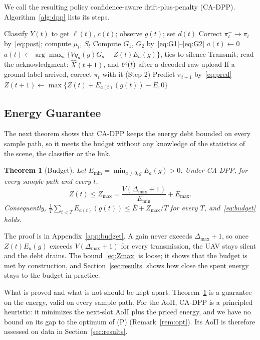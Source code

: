\documentclass[journal]{IEEEtran}
\newtheorem{theorem}{Theorem}
\theoremstyle{remark}
\newcommand{\lab}{\ell}
\begin{document}
We call the resulting policy confidence-aware drift-plus-penalty (CA-DPP). Algorithm~\ref{alg:dpp} lists its steps.

\begin{algorithm}[t]
\caption{CA-DPP, executed by the UAV in slot $t$}\label{alg:dpp}
\begin{algorithmic}[1]
\State Classify $Y(t)$ to get $\lab(t)$, $c(t)$; observe $g(t)$; set $d(t)$
\State Correct $\pi^-_t\to\pi_t$ by~\eqref{eq:post}; compute $\mu_t$, $S_t$
\State Compute $G_1$, $G_2$ by~\eqref{eq:G1}--\eqref{eq:G2}
 $a(t)\gets0$
\Else\ $a(t)\gets\arg\max_a\{Vq_a(g)G_a-Z(t)E_a(g)\}$, ties to silence
\EndIf
\State Transmit; read the acknowledgment: $\hat X(t+1)$, and $\lab^{\rm g}(t)$ after a decoded raw upload
\State If a ground label arrived, correct $\pi_t$ with it (Step 2)
\State Predict $\pi^-_{t+1}$ by~\eqref{eq:pred}
\State $Z(t+1)\gets\max\big\{Z(t)+E_{a(t)}(g(t))-\bar E,0\big\}$
\end{algorithmic}
\end{algorithm}

\subsection{Energy Guarantee}
The next theorem shows that CA-DPP keeps the energy debt bounded on every sample path, so it meets the budget without any knowledge of the statistics of the scene, the classifier or the link.

\begin{theorem}[Budget]\label{thm:budget}
Let $E_{\min}=\min_{a\neq0,g}E_a(g)>0$. Under CA-DPP, for every sample path and every $t$,
\begin{equation}\label{eq:Zmax}
Z(t)\le Z_{\max}=\frac{V(\Delta_{\max}+1)}{E_{\min}}+E_{\max}.
\end{equation}
Consequently, $\frac1T\sum_{t<T}E_{a(t)}(g(t))\le\bar E+Z_{\max}/T$ for every $T$, and~\eqref{eq:budget} holds.
\end{theorem}

The proof is in Appendix~\ref{app:budget}. A gain never exceeds $\Delta_{\max}+1$, so once $Z(t)E_a(g)$ exceeds $V(\Delta_{\max}+1)$ for every transmission, the UAV stays silent and the debt drains. The bound~\eqref{eq:Zmax} is loose; it shows that the budget is met by construction, and Section~\ref{sec:results} shows how close the spent energy stays to the budget in practice.

What is proved and what is not should be kept apart. Theorem~\ref{thm:budget} is a guarantee on the energy, valid on every sample path. For the AoII, CA-DPP is a principled heuristic: it minimizes the next-slot AoII plus the priced energy, and we have no bound on its gap to the optimum of (P) (Remark~\ref{rem:opt}). Its AoII is therefore assessed on data in Section~\ref{sec:results}.
\end{document}
